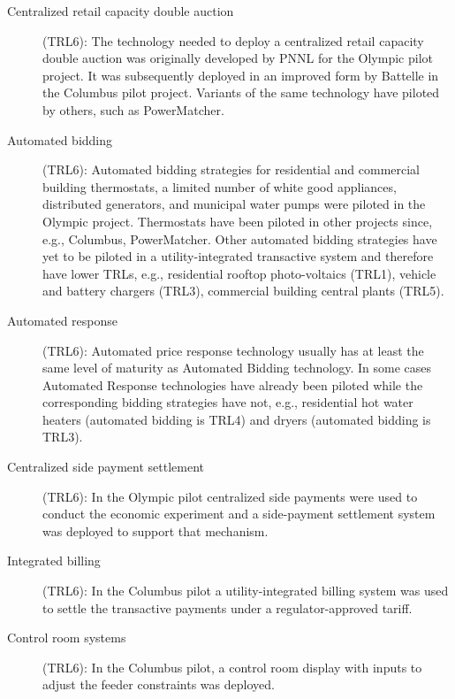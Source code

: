\begin{description}

    \item[Centralized retail capacity double auction] (TRL6): The technology needed to deploy a centralized retail capacity double auction was originally developed by PNNL for the Olympic pilot project. It was subsequently deployed in an improved form by Battelle in the Columbus pilot project. Variants of the same technology have piloted by others, such as PowerMatcher.
    
    \item[Automated bidding] (TRL6): Automated bidding strategies for residential and commercial building thermostats, a limited number of white good appliances, distributed generators, and municipal water pumps were piloted in the Olympic project.  Thermostats have been piloted in other projects since, e.g., Columbus, PowerMatcher.  Other automated bidding strategies have yet to be piloted in a utility-integrated transactive system and therefore have lower TRLs, e.g., residential rooftop photo-voltaics (TRL1), vehicle and battery chargers (TRL3), commercial building central plants (TRL5). 
    
    \item[Automated response] (TRL6): Automated price response technology usually has at least the same level of maturity as Automated Bidding technology. In some cases Automated Response technologies have already been piloted while the corresponding bidding strategies have not, e.g., residential hot water heaters (automated bidding is TRL4) and dryers (automated bidding is TRL3).
    
    \item[Centralized side payment settlement] (TRL6): In the Olympic pilot centralized side payments were used to conduct the economic experiment and a side-payment settlement system was deployed to support that mechanism.
    
    \item[Integrated billing] (TRL6): In the Columbus pilot a utility-integrated billing system was used to settle the transactive payments under a regulator-approved tariff.
    
    \item[Control room systems] (TRL6): In the Columbus pilot, a control room display with inputs to adjust the feeder constraints was deployed.
    
\end{description}

